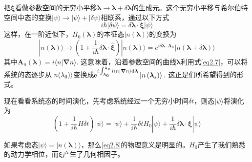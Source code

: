 把$\boldsymbol{\xi}$看做参数空间的无穷小平移$\boldsymbol{\lambda} \to \boldsymbol{\lambda} + \delta \boldsymbol{\lambda}$的生成元。这个无穷小平移与希尔伯特空间中态的变换$|\psi\rangle \rightarrow|\psi\rangle+|\delta \psi\rangle$相联系，通过以下方式
\begin{equation}
    i \hbar|\delta \psi\rangle=\delta \boldsymbol{\lambda} \cdot \boldsymbol{\xi}|\psi\rangle
    \label{eq2.6}
\end{equation}
这样，在一阶近似下，$H_0 (\bm{\lambda})$的本征态$|n(\bm{\lambda})\rangle$的变换为
\begin{equation}
    |n(\boldsymbol{\lambda})\rangle \rightarrow\left(1+\frac{1}{i \hbar} \delta \boldsymbol{\lambda} \cdot \hat{\boldsymbol{\xi}}\right)|n(\boldsymbol{\lambda})\rangle=e^{i \delta \boldsymbol{\lambda} \cdot \boldsymbol{A}_{n}}|n(\boldsymbol{\lambda}+\delta \boldsymbol{\lambda})\rangle
    \label{eq2.7}
\end{equation}
其中$\boldsymbol{A}_{n}(\boldsymbol{\lambda})=i\langle n | \boldsymbol{\nabla} n\rangle.$ 这意味着，沿着参数空间的曲线$\bm{\lambda}$利用式\ref{eq2.7}，可以将系统的态逐步从$|n(\mathrm{\lambda_0})\rangle$变换成$\mathrm{e}^{i \int_{\bm{\lambda_0}}^{\bm{\lambda_s}}   i\langle n | \boldsymbol{\nabla} n\rangle \mathrm{d}\bm{\lambda}}\left|n\left(\boldsymbol{\lambda}_{s}\right)\right\rangle.$ 这正是们所希望得到的形式。

现在看看系统态的时间演化，先考虑系统经过一个无穷小时间$\delta t$，则态$|\psi \rangle$将演化为
\begin{equation}
     \left(1+\frac{1}{i \hbar} H \delta t\right)|\psi\rangle=|\psi\rangle+\frac{1}{i \hbar} \delta t H_{0}|\psi\rangle+\frac{1}{i \hbar} \delta \boldsymbol{\lambda} \cdot \boldsymbol{\xi}|\psi\rangle
   \label{eq2.8}
\end{equation}

如果考虑态$|\psi \rangle = |n(\bm{\lambda}) \rangle$，那么\ref{eq2.8}的物理意义是明显的。$H_0$产生了我们熟悉的动力学相位，而$\boldsymbol{\xi}$产生了几何相因子。

